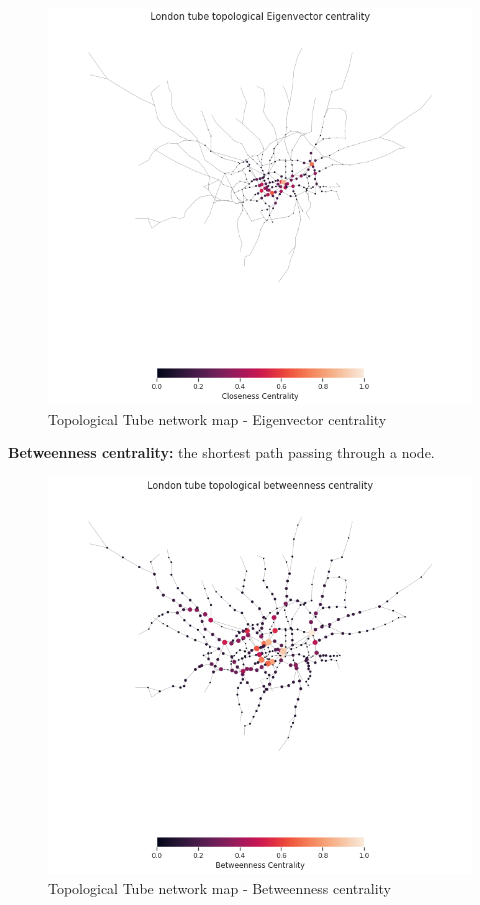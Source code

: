 \documentclass[10pt]{report}
\numberwithin{figure}{section}
\numberwithin{table}{section}
\begin{document}
        
    \begin{figure}[htp]
        \centering
        \includegraphics[width=14cm]{Image/Part1_topologicalmap_eigenvector.png}
        \caption{Topological Tube network map - Eigenvector centrality}
        \label{fig:galaxy}
    \end{figure} 

   \vspace{5mm} %
   
        \textbf{Betweenness centrality:} the shortest path passing through a node.
        
    \begin{figure}[htp]
        \centering
        \includegraphics[width=14cm]{Image/Part1_topologicalmap_betweenness.png}
        \caption{Topological Tube network map - Betweenness centrality}
        \label{fig:galaxy}
    \end{figure} 
\end{document}
